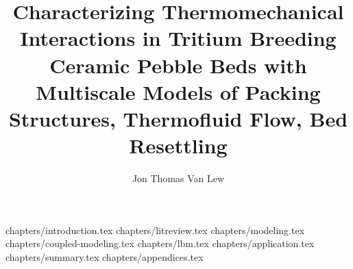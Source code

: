\documentclass [PhD] {uclathes}
\title      {Characterizing Thermomechanical Interactions in Tritium Breeding Ceramic Pebble Beds with Multiscale Models of Packing Structures, Thermofluid Flow, Bed Resettling}
\author     {Jon Thomas Van Lew}
\begin{document}
\makeintropages
		{chapters/introduction.tex}
		{chapters/litreview.tex}
		{chapters/modeling.tex}
		{chapters/coupled-modeling.tex}
		{chapters/lbm.tex}
		{chapters/application.tex}
		{chapters/summary.tex}
		{chapters/appendices.tex}


\end{document}
